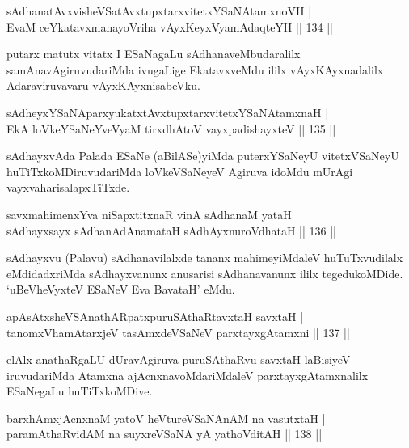 \begin{shl}
sAdhanatAvxvisheVSatAvxtupxtarxvitetxYSaNAtamxnoVH |\\
EvaM ceYkatavxmanayoVriha vAyxKeyxVyamAdaqteYH \hfill || 134 ||
\end{shl}

\begin{artha}
putarx matutx vitatx I ESaNagaLu sAdhanaveMbudaralilx samAnavAgiruvudariMda ivugaLige EkatavxveMdu ililx vAyxKAyxnadalilx Adaraviruvavaru vAyxKAyxnisabeVku.
\end{artha}

\begin{shl}
sAdheyxYSaNAparxyukatxtAvxtupxtarxvitetxYSaNAtamxnaH |\\
EkA loVkeYSaNeYveVyaM tirxdhA\s toV vayxpadishayxteV \hfill || 135 ||
\end{shl}

\begin{artha}
sAdhayxvAda Palada ESaNe (aBilASe)yiMda puterxYSaNeyU vitetxVSaNeyU huTiTxkoMDiruvudariMda loVkeVSaNeyeV Agiruva idoMdu mUrAgi vayxvaharisalapxTiTxde.
\end{artha}


\begin{shl}
savxmahimenxYva niSapxtitxnaR vinA sAdhanaM yataH |\\
sAdhayxsayx sAdhanAdAnamataH sAdhAyxnuroVdhataH \hfill || 136 ||
\end{shl}

\begin{artha}
sAdhayxvu (Palavu) sAdhanavilalxde tananx mahimeyiMdaleV huTuTxvudilalx eMdidadxriMda sAdhayxvanunx anusarisi sAdhanavanunx ililx tegedukoMDide. `uBeVheVyxteV ESaNeV Eva BavataH' eMdu.
\end{artha}%

\begin{shl}
apAsAtxsheVSAnathARpatxpuruSAthaRtavxtaH savxtaH |\\
tanomxVhamAtarxjeV tasAmxdeVSaNeV parxtayxgAtamxni \hfill || 137 ||
\end{shl}

\begin{artha}
elAlx anathaRgaLU dUravAgiruva puruSAthaRvu savxtaH laBisiyeV iruvudariMda Atamxna ajAcnxnavoMdariMdaleV parxtayxgAtamxnalilx ESaNegaLu huTiTxkoMDive.
\end{artha}

\begin{shl}
barxhAmxjAcnxnaM yatoV heVtureVSaNAnAM na vasutxtaH |\\
paramAthaRvidAM na suyxreVSaNA yA yathoVditAH \hfill || 138 ||
\end{shl}


